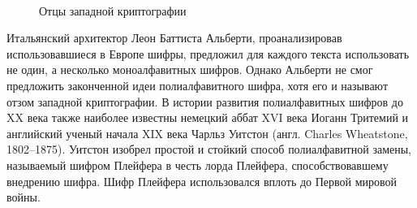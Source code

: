 \begin{figure}[tb]
	\centering
	~~~~
	\caption{Отцы западной криптографии}
\end{figure}

Итальянский архитектор Леон Баттиста Альберти, проанализировав использовавшиеся в Европе шифры, предложил для каждого текста использовать не один, а несколько моноалфавитных шифров. Однако Альберти не смог предложить законченной идеи полиалфавитного шифра, хотя его и называют отзом западной криптографии. В истории развития полиалфавитных шифров до XX века также наиболее известны немецкий аббат XVI века Иоганн Тритемий и английский ученый начала XIX века Чарльз Уитстон (англ. Charles Wheatstone, 1802--1875). Уитстон изобрел простой и стойкий способ полиалфавитной замены, называемый шифром Плейфера в честь лорда Плейфера, способствовавшему внедрению шифра. Шифр Плейфера использовался вплоть до Первой мировой войны.

